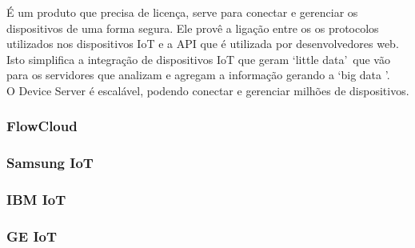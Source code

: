 É um produto que precisa de licença, serve para conectar e gerenciar os dispositivos de uma forma segura. Ele provê a ligação entre os os protocolos utilizados nos dispositivos IoT e a API que é utilizada por desenvolvedores web. Isto simplifica a integração de dispositivos IoT que geram \lq little data\rq\ que vão para os servidores que analizam e agregam a informação gerando a \lq big data \rq.\\
O Device Server é escalável, podendo conectar e gerenciar milhões de dispositivos.

\subsubsection{FlowCloud}
\subsubsection{Samsung IoT}
\subsubsection{IBM IoT}
\subsubsection{GE IoT}
